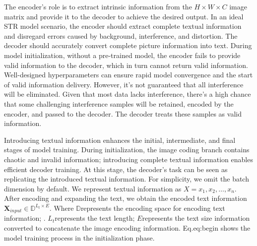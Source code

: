 \documentclass[runningheads]{llncs}
\begin{document}
The encoder's role is to extract intrinsic information from the $H\times W\times C$ image matrix and provide it to the decoder to achieve the desired output.	In an ideal STR model scenario, the encoder should extract complete textual information and disregard errors caused by background, interference, and distortion.	The decoder should accurately convert complete picture information into text.	During model initialization, without a pre-trained model, the encoder fails to provide valid information to the decoder, which in turn cannot return valid information.	Well-designed hyperparameters can ensure rapid model convergence and the start of valid information delivery.	However, it's not guaranteed that all interference will be eliminated.	Given that most data lacks interference, there's a high chance that some challenging interference samples will be retained, encoded by the encoder, and passed to the decoder.	The decoder treats these samples as valid information.	

Introducing textual information enhances the initial, intermediate, and final stages of model training.	During initialization, the image coding branch contains chaotic and invalid information; introducing complete textual information enables efficient decoder training.	At this stage, the decoder's task can be seen as replicating the introduced textual information.	For simplicity, we omit the batch dimension by default.	We represent textual information as $X = {x_1, x_2, \ldots, x_n}$. After encoding and expanding the text, we obtain the encoded text information $\textbf{X}_{input}\in\mathbb{D}^{L_{t}\times E}$.	Where $\mathbb{D}$represents the encoding space for encoding text information; . $L_{t}$represents the text length; $E$represents the text size information converted to concatenate the image encoding information. Eq.{eq:begin} shows the model training process in the initialization phase.
\end{document}
